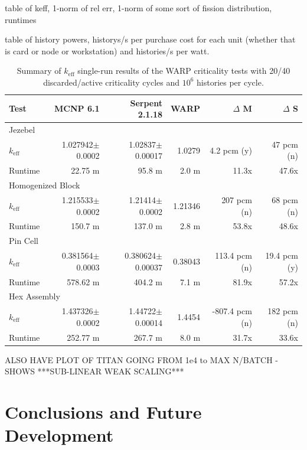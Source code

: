 \documentclass[preprint,12pt]{elsarticle}
\begin{document}
table of keff, 1-norm of rel err, 1-norm of some sort of fission distribution, runtimes

table of history powers, historys/s per purchase cost for each unit (whether that is card or node or workstation) and histories/s per watt. 

\begin{table}[h]
\centering
\caption{Summary of $k_\mathrm{eff}$ single-run results of the WARP criticality tests with 20/40 discarded/active criticality cycles and $10^6$ histories per cycle.}
\label{test_summary_6}
\small
\begin{tabular}{| l | r | r | r | r | r |}
\hline
Test & MCNP 6.1 & Serpent 2.1.18 & WARP & $\Delta$ M & $\Delta$ S \\
\hline
\hline
\multicolumn{6}{|l|}{Jezebel} \\
\hline
$k_\mathrm{eff}$ & 1.027942$\pm$0.0002 & 1.02837$\pm$0.00017 & 1.0279 & 4.2 pcm (y) & 47 pcm (n) \\
\hline
Runtime & 22.75 m & 95.8 m & 2.0 m & 11.3x & 47.6x \\
\hline
\hline
\multicolumn{6}{|l|}{Homogenized Block }\\
\hline
$k_\mathrm{eff}$ & 1.215533$\pm$0.0002 & 1.21414$\pm$0.0002 & 1.21346 & 207 pcm (n) & 68 pcm (n) \\
\hline
Runtime & 150.7 m & 137.0 m & 2.8 m & 53.8x & 48.6x \\
\hline
\hline
\multicolumn{6}{|l|}{Pin Cell}\\
\hline
$k_\mathrm{eff}$ & 0.381564$\pm$0.0003 & 0.380624$\pm$0.00037 & 0.38043 & 113.4 pcm (n) & 19.4 pcm (y) \\
\hline
Runtime & 578.62 m & 404.2 m & 7.1 m & 81.9x & 57.2x \\
\hline
\hline
\multicolumn{6}{|l|}{Hex Assembly}\\
\hline
$k_\mathrm{eff}$ & 1.437326$\pm$0.0002 & 1.44722$\pm$0.00014 & 1.4454 & -807.4 pcm (n) & 182 pcm (n) \\
\hline
Runtime & 252.77 m & 267.7 m & 8.0 m & 31.7x & 33.6x \\
\hline
\end{tabular}
\end{table}


ALSO HAVE PLOT OF TITAN GOING FROM 1e4 to MAX N/BATCH - SHOWS ***SUB-LINEAR WEAK SCALING***

\section{Conclusions and Future Development}
\label{sec:conc}
\end{document}

